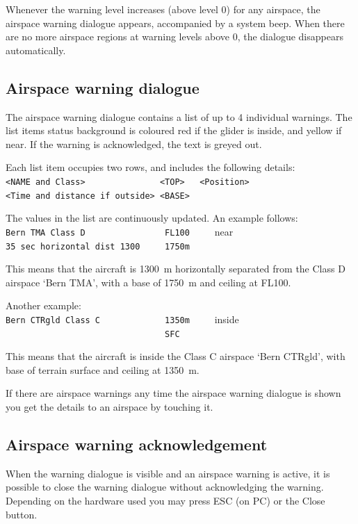 Whenever the warning level increases (above level 0) for any airspace,
the airspace warning dialogue appears, accompanied by a system beep.
When there are no more airspace regions at warning levels above
0, the dialogue disappears automatically.


\subsection*{Airspace warning dialogue}

The airspace warning dialogue contains a list of up to 4 individual
warnings.  The list items status background is coloured red if the glider is
inside, and yellow if near.  If the warning is acknowledged, the
text is greyed out.

Each list item occupies two rows, and includes the following details:\\
\verb+<NAME and Class>               <TOP>   <Position>+\\
\verb+<Time and distance if outside> <BASE>+

The values in the list are continuously updated. 
An example follows:\\
\verb+Bern TMA Class D                FL100     +\colorbox{AirspaceYellow}{near}\\
\verb+35 sec horizontal dist 1300     1750m+

This means that the aircraft is 1300~m horizontally separated from the Class D airspace
`Bern TMA', with a base of 1750~m and ceiling at FL100.

Another example:\\
\verb+Bern CTRgld Class C             1350m     +\colorbox{AirspaceRed}{inside}\\
\verb+                                SFC+

This means that the aircraft is inside the Class C airspace `Bern
CTRgld', with base of terrain surface and ceiling at 1350~m.

If there are airspace warnings any time the airspace warning dialogue is shown 
you get the details to an airspace by touching it.


\subsection*{Airspace warning acknowledgement}

When the warning dialogue is visible and an airspace warning is
active, it is possible to close the warning dialogue without acknowledging the warning.
Depending on the hardware used you may press ESC (on PC) or the Close button.

